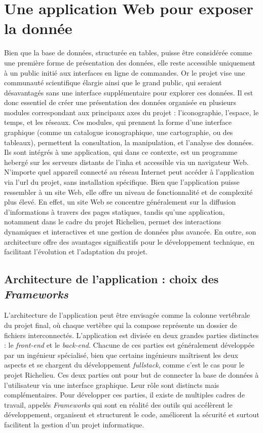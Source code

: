 \section{Une application Web pour exposer la donnée}\label{section:web}
Bien que la base de données, structurée en tables, puisse être considérée comme une première forme de présentation des données, elle reste accessible uniquement à un public initié aux interfaces en ligne de commandes. Or le projet vise une communauté scientifique élargie ainsi que le grand public, qui seraient désavantagés sans une interface supplémentaire pour explorer ces données. Il est donc essentiel de créer une présentation des données organisée en plusieurs modules correspondant aux principaux axes du projet : l'iconographie, l'espace, le temps, et les réseaux. Ces modules, qui prennent la forme d'une interface graphique (comme un catalogue iconographique, une cartographie, ou des tableaux), permettent la consultation, la manipulation, et l'analyse des données. 
Ils sont intégrés à une application, qui dans ce contexte, est un programme hebergé sur les serveurs distants de l'\acrshort{inha} et accessible via un navigateur Web. N'importe quel appareil connecté au réseau Internet peut accéder à l'application via l'\acrshort{url} du projet, sans installation spécifique. Bien que l'application puisse ressembler à un site Web, elle offre un niveau de fonctionnalité et de complexité plus élevé. En effet, un site Web se concentre généralement sur la diffusion d'informations à travers des pages statiques, tandis qu'une application, notamment dans le cadre du projet Richelieu, permet des interactions dynamiques et interactives et une gestion de données plus avancée. En outre, son architecture offre des avantages significatifs pour le développement technique, en facilitant l'évolution et l'adaptation du projet. 

\subsection{Architecture de l'application : choix des \textit{Frameworks}}
L'architecture de l'application peut être envisagée comme la colonne vertébrale du projet final, où chaque vertèbre qui la compose représente un dossier de fichiers interconnectés. L'application est divisée en deux grandes parties distinctes : le \textit{front-end} et le \textit{back-end}. Chacune de ces parties est généralement développée par un ingénieur spécialisé, bien que certains ingénieurs maîtrisent les deux aspects et se chargent du développement \textit{fullstack}, comme c'est le cas pour le projet Richelieu. Ces deux parties ont pour but de connecter la base de données à l'utilisateur via une interface graphique. Leur rôle sont distincts mais complémentaires. Pour développer ces parties, il existe de multiples cadres de travail, appelés \textit{Frameworks} qui sont en réalité des outils qui accélèrent le développement, organisent et structurent le code, améliorent la sécurité et surtout facilitent la gestion d'un projet informatique. 

